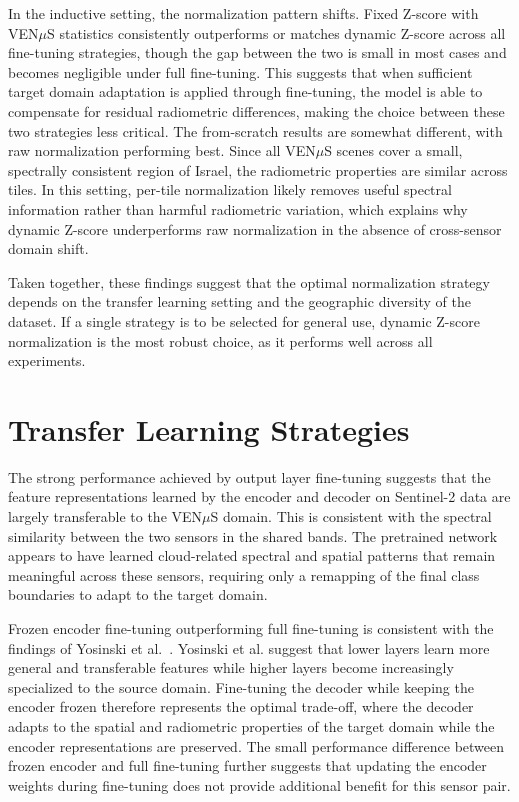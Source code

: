 In the inductive setting, the normalization pattern shifts. Fixed Z-score with VEN$\mu$S statistics consistently outperforms or matches dynamic Z-score across all fine-tuning strategies, though the gap between the two is small in most cases and becomes negligible under full fine-tuning. This suggests that when sufficient target domain adaptation is applied through fine-tuning, the model is able to compensate for residual radiometric differences, making the choice between these two strategies less critical. The from-scratch results are somewhat different, with raw normalization performing best. Since all VEN$\mu$S scenes cover a small, spectrally consistent region of Israel, the radiometric properties are similar across tiles. In this setting, per-tile normalization likely removes useful spectral information rather than harmful radiometric variation, which explains why dynamic Z-score underperforms raw normalization in the absence of cross-sensor domain shift.

Taken together, these findings suggest that the optimal normalization strategy depends on the transfer learning setting and the geographic diversity of the dataset. If a single strategy is to be selected for general use, dynamic Z-score normalization is the most robust choice, as it performs well across all experiments.

\section{Transfer Learning Strategies}
\label{sec:discussion_tl}

The strong performance achieved by output layer fine-tuning suggests that the feature representations learned by the encoder and decoder on Sentinel-2 data are largely transferable to the VEN$\mu$S domain. This is consistent with the spectral similarity between the two sensors in the shared bands. The pretrained network appears to have learned cloud-related spectral and spatial patterns that remain meaningful across these sensors, requiring only a remapping of the final class boundaries to adapt to the target domain.

Frozen encoder fine-tuning outperforming full fine-tuning is consistent with the findings of Yosinski et al.~\cite{yosinski2014}. Yosinski et al. suggest that lower layers learn more general and transferable features while higher layers become increasingly specialized to the source domain. Fine-tuning the decoder while keeping the encoder frozen therefore represents the optimal trade-off, where the decoder adapts to the spatial and radiometric properties of the target domain while the encoder representations are preserved. The small performance difference between frozen encoder and full fine-tuning further suggests that updating the encoder weights during fine-tuning does not provide additional benefit for this sensor pair.


